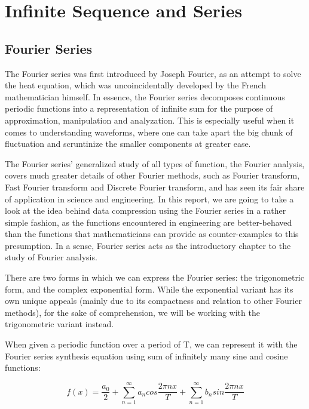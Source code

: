 \documentclass[a4paper]{article}
\begin{document}
	\newpage
	\section{Infinite Sequence and Series}
	\subsection{Fourier Series}
	The Fourier series was first introduced by Joseph Fourier, as an attempt to solve the heat equation, which was uncoincidentally developed by the French mathematician himself. In essence, the Fourier series decomposes continuous periodic functions into a representation of infinite sum for the purpose of approximation, manipulation and analyzation. This is especially useful when it comes to understanding waveforms, where one can take apart the big chunk of fluctuation and scruntinize the smaller components at greater ease.
	
	The Fourier series' generalized study of all types of function, the Fourier analysis, covers much greater details of other Fourier methods, such as Fourier transform, Fast Fourier transform and Discrete Fourier transform, and has seen its fair share of application in science and engineering. In this report, we are going to take a look at the idea behind data compression using the Fourier series in a rather simple fashion, as the functions encountered in engineering are better-behaved than the functions that mathematicians can provide as counter-examples to this presumption. In a sense, Fourier series acts as the introductory chapter to the study of Fourier analysis.
	
	There are two forms in which we can express the Fourier series: the trigonometric form, and the complex exponential form. While the exponential variant has its own unique appeals (mainly due to its compactness and relation to other Fourier methods), for the sake of comprehension, we will be working with the trigonometric variant instead.
	
	When given a periodic function over a period of T, we can represent it with the Fourier series synthesis equation using sum of infinitely many sine and cosine functions:
	
	\begin{equation*}
	f(x) = \frac{a_0}{2} + \sum\limits_{n=1}^\infty a_n cos\frac{2\pi n x}{T} + \sum\limits_{n=1}^\infty b_n sin\frac{2\pi n x}{T}
	\end{equation*}
	
\end{document}
